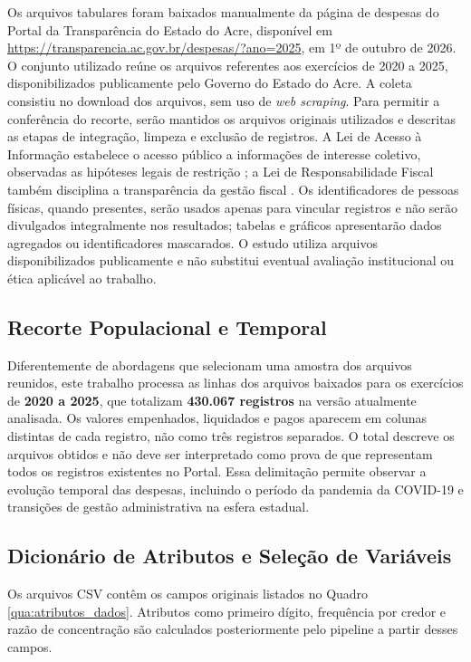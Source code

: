 \documentclass[
    12pt,               %
    openright,          %
    oneside,            %
    a4paper,            %
    chapter=TITLE,      %
    sumario=tradicional,%
    english,            %
    brazilian,          %
 ]{abntex2}
\begin{document}
Os arquivos tabulares foram baixados manualmente da página de despesas do Portal da Transparência do Estado do Acre, disponível em \url{https://transparencia.ac.gov.br/despesas/?ano=2025}, em 1º de outubro de 2026. O conjunto utilizado reúne os arquivos referentes aos exercícios de 2020 a 2025, disponibilizados publicamente pelo Governo do Estado do Acre. A coleta consistiu no download dos arquivos, sem uso de \textit{web scraping}. Para permitir a conferência do recorte, serão mantidos os arquivos originais utilizados e descritas as etapas de integração, limpeza e exclusão de registros. A Lei de Acesso à Informação estabelece o acesso público a informações de interesse coletivo, observadas as hipóteses legais de restrição \cite{lai2011}; a Lei de Responsabilidade Fiscal também disciplina a transparência da gestão fiscal \cite{lrf2000}. Os identificadores de pessoas físicas, quando presentes, serão usados apenas para vincular registros e não serão divulgados integralmente nos resultados; tabelas e gráficos apresentarão dados agregados ou identificadores mascarados. O estudo utiliza arquivos disponibilizados publicamente e não substitui eventual avaliação institucional ou ética aplicável ao trabalho.

\subsection{Recorte Populacional e Temporal}\label{subsec:recorte_populacional}

Diferentemente de abordagens que selecionam uma amostra dos arquivos reunidos, este trabalho processa as linhas dos arquivos baixados para os exercícios de \textbf{2020 a 2025}, que totalizam \textbf{430.067 registros} na versão atualmente analisada. Os valores empenhados, liquidados e pagos aparecem em colunas distintas de cada registro, não como três registros separados. O total descreve os arquivos obtidos e não deve ser interpretado como prova de que representam todos os registros existentes no Portal. Essa delimitação permite observar a evolução temporal das despesas, incluindo o período da pandemia da COVID-19 e transições de gestão administrativa na esfera estadual.

\subsection{Dicionário de Atributos e Seleção de Variáveis}\label{subsec:dicionario_attributos}

Os arquivos CSV contêm os campos originais listados no Quadro \ref{qua:atributos_dados}. Atributos como primeiro dígito, frequência por credor e razão de concentração são calculados posteriormente pelo pipeline a partir desses campos.
\end{document}
